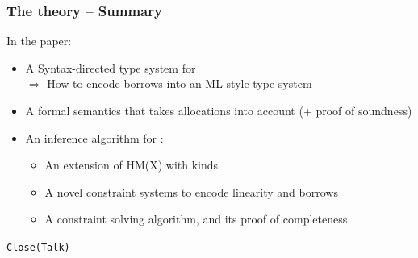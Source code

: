 \documentclass[aspectratio=169,dvipsnames,svgnames,10pt]{beamer}
\begin{document}
\begin{frame}
  \frametitle{The theory -- Summary}

  In the paper:

  \begin{itemize}
  \item A Syntax-directed type system for \lang\\
    $\Rightarrow$ How to encode borrows into an ML-style type-system
  \item A formal semantics that takes allocations into account (+ proof of soundness)
  \item An inference algorithm for \lang:
    \begin{itemize}
    \item An extension of HM(X) with kinds
    \item A novel constraint systems to encode linearity and borrows
    \item A constraint solving algorithm, and its proof of completeness
    \end{itemize}
  \end{itemize}
\end{frame}

\begin{frame}[standout]

  \centering\Huge\texttt{Close(Talk)}
  
\end{frame}


\end{document}
